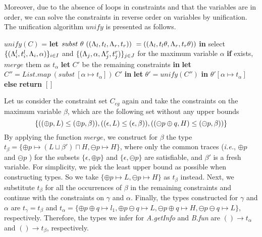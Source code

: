 {{{Moreover, due to the absence of  loops in constraints and that the variables are in order, we can solve the constraints in reverse order on variables by unification. The unification algorithm $unify$ is presented as follows.
{
\begin{algorithmic}
\STATE $unify(C)$ =
\STATE \quad \textbf{let} $subst ~\theta~(({\Lambda_l},{t_l},{\Lambda_r},{t_r}))~ = (({\Lambda_l},{t_l\theta},{\Lambda_r},{t_r\theta}))$ \textbf{in}
\STATE \quad select $\{({\Lambda_i^l},{t_i^l},{\Lambda_i},{\alpha})\}_{i\in I}$ and $\{({\Lambda_j},{\alpha},{\Lambda_j^r},{t_j^r})\}_{j\in J}$ for the maximum variable $\alpha$ \textbf{if} exists, $merge$ them as $t_{\alpha}$
\STATE \quad\quad \textbf{let} $C'$ be the remaining constraints \textbf{in} 
\STATE \quad\quad \textbf{let} $C'' = List.map~ (subst~[\alpha \mapsto t_{\alpha}])~ C'$ \textbf{in} 
\STATE \quad\quad \textbf{let} $\theta' = unify(C'')$ \textbf{in} $\theta'[\alpha \mapsto t_{\alpha}]$
\STATE \quad \textbf{else} \textbf{return} $[]$
\end{algorithmic}
}

Let us consider the constraint set $C_{eg}$ again and take the constraints on the maximum variable $\beta$, which are the following set without any upper bounds
{\small
$$
\{((\oplus p,L)\leq(\oplus p,\beta)),
((\epsilon,L)\leq(\epsilon,\beta)),
((\ominus p\oplus q,H)\leq(\ominus p,\beta))\}
$$
}
By applying the function $merge$, we construct for $\beta$ the type $t_{\beta} = \{\oplus p \mapsto (L\sqcup \beta')\sqcap H, \ominus p \mapsto H\}$,  where only the common traces (\emph{i.e.}, $\oplus p$ and $\ominus p$ ) for the subsets $\{\epsilon, \oplus p\}$ and $\{\epsilon, \ominus p\} $ are satisfiable, and $\beta'$ is a fresh variable.
For simplicity, we pick the least upper bound as possible when constructing types.
So we take $\{\oplus p \mapsto L, \ominus p \mapsto H\}$ as $t_{\beta}$ instead.
Next, we substitute $t_{\beta}$ for all the occurrences of $\beta$ in the remaining constraints and continue with the constraints on $\gamma$ and $\alpha$.
Finally, the types constructed for $\gamma$ and $\alpha$ are $t_{\gamma} = t_{\beta}$ and $t_{\alpha} = \{\oplus p\oplus q \mapsto l_1, \oplus p\ominus q\mapsto L, \ominus p\oplus q \mapsto H, \ominus p\ominus q \mapsto L\}$, respectively.
Therefore, the types we infer for \textit{A.getInfo} and \textit{B.fun} are $()\rightarrow t_{\alpha}$ and $()\rightarrow t_{\beta}$, respectively.



}}}
